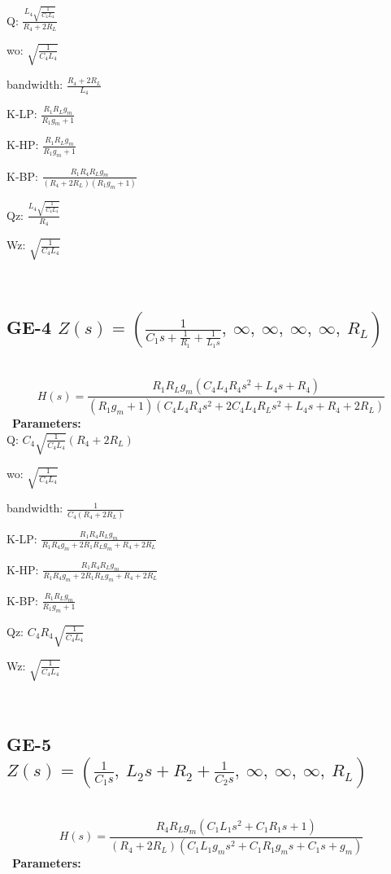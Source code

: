 \documentclass{article}
\begin{document}
Q: $\frac{L_{4} \sqrt{\frac{1}{C_{4} L_{4}}}}{R_{4} + 2 R_{L}}$\ 

wo: $\sqrt{\frac{1}{C_{4} L_{4}}}$\ 

bandwidth: $\frac{R_{4} + 2 R_{L}}{L_{4}}$\ 

K-LP: $\frac{R_{1} R_{L} g_{m}}{R_{1} g_{m} + 1}$\ 

K-HP: $\frac{R_{1} R_{L} g_{m}}{R_{1} g_{m} + 1}$\ 

K-BP: $\frac{R_{1} R_{4} R_{L} g_{m}}{\left(R_{4} + 2 R_{L}\right) \left(R_{1} g_{m} + 1\right)}$\ 

Qz: $\frac{L_{4} \sqrt{\frac{1}{C_{4} L_{4}}}}{R_{4}}$\ 

Wz: $\sqrt{\frac{1}{C_{4} L_{4}}}$\ 

\ 

\subsection{GE-4 $Z(s) = \left( \frac{1}{C_{1} s + \frac{1}{R_{1}} + \frac{1}{L_{1} s}}, \  \infty, \  \infty, \  \infty, \  \infty, \  R_{L}\right)$ } \ 
\textbf{\[H(s) = \frac{R_{1} R_{L} g_{m} \left(C_{4} L_{4} R_{4} s^{2} + L_{4} s + R_{4}\right)}{\left(R_{1} g_{m} + 1\right) \left(C_{4} L_{4} R_{4} s^{2} + 2 C_{4} L_{4} R_{L} s^{2} + L_{4} s + R_{4} + 2 R_{L}\right)}\] } \ 
\textbf{Parameters:}\\ 

Q: $C_{4} \sqrt{\frac{1}{C_{4} L_{4}}} \left(R_{4} + 2 R_{L}\right)$\ 

wo: $\sqrt{\frac{1}{C_{4} L_{4}}}$\ 

bandwidth: $\frac{1}{C_{4} \left(R_{4} + 2 R_{L}\right)}$\ 

K-LP: $\frac{R_{1} R_{4} R_{L} g_{m}}{R_{1} R_{4} g_{m} + 2 R_{1} R_{L} g_{m} + R_{4} + 2 R_{L}}$\ 

K-HP: $\frac{R_{1} R_{4} R_{L} g_{m}}{R_{1} R_{4} g_{m} + 2 R_{1} R_{L} g_{m} + R_{4} + 2 R_{L}}$\ 

K-BP: $\frac{R_{1} R_{L} g_{m}}{R_{1} g_{m} + 1}$\ 

Qz: $C_{4} R_{4} \sqrt{\frac{1}{C_{4} L_{4}}}$\ 

Wz: $\sqrt{\frac{1}{C_{4} L_{4}}}$\ 

\ 

\subsection{GE-5 $Z(s) = \left( \frac{1}{C_{1} s}, \  L_{2} s + R_{2} + \frac{1}{C_{2} s}, \  \infty, \  \infty, \  \infty, \  R_{L}\right)$ } \ 
\textbf{\[H(s) = \frac{R_{4} R_{L} g_{m} \left(C_{1} L_{1} s^{2} + C_{1} R_{1} s + 1\right)}{\left(R_{4} + 2 R_{L}\right) \left(C_{1} L_{1} g_{m} s^{2} + C_{1} R_{1} g_{m} s + C_{1} s + g_{m}\right)}\] } \ 
\textbf{Parameters:}\\ 
\end{document}

